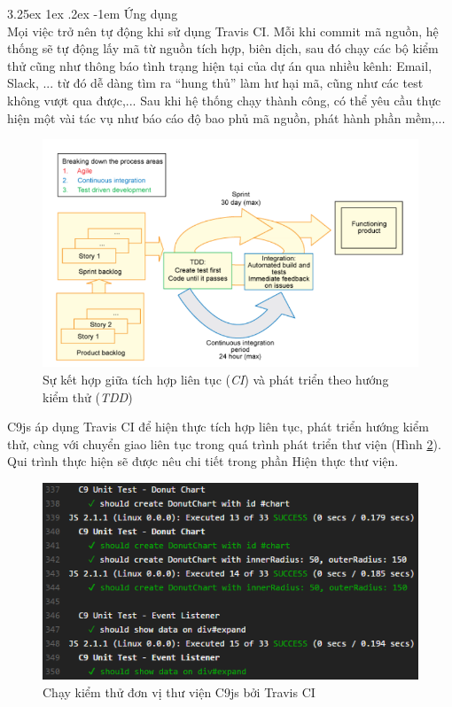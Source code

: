 \documentclass[12pt,a4paper,twoside]{article}
\makeatletter
\newcommand*\NewPage{\newpage\null\thispagestyle{empty}\newpage}
\newcommand{\myparagraph}[1]{\paragraph{#1}\mbox{}\\} %
\renewcommand\paragraph{\@startsection{paragraph}{5}{\z@}%
  {3.25ex \@plus1ex \@minus.2ex}%
  {-1em}%
  {\normalfont\normalsize\bfseries}}
\makeatother
\begin{document}
\myparagraph{Ứng dụng}
Mọi việc trở nên tự động khi sử dụng Travis CI. Mỗi khi commit mã nguồn, hệ thống sẽ tự động lấy mã từ nguồn tích hợp, biên dịch, sau đó chạy các bộ kiểm thử cũng như thông báo tình trạng hiện tại của dự án qua nhiều kênh: Email, Slack, ... từ đó dễ dàng tìm ra “hung thủ” làm hư hại mã, cũng như các test không vượt qua được,... Sau khi hệ thống chạy thành công, có thể yêu cầu thực hiện một vài tác vụ như báo cáo độ bao phủ mã nguồn, phát hành phần mềm,...

\begin{figure}[!h]
	\begin{center}
    \includegraphics[scale=0.9]{image/ci_cd}
    \caption{Sự kết hợp giữa tích hợp liên tục (\textit{CI}) và phát triển theo hướng kiểm thử (\textit{TDD})}
    \label{fig:ci_cd}
	\end{center}
\end{figure}

C9js áp dụng Travis CI để hiện thực tích hợp liên tục, phát triển hướng kiểm thử, cùng với chuyển giao liên tục trong quá trình phát triển thư viện (Hình \ref{fig:ci_c9}). Qui trình thực hiện sẽ được nêu chi tiết trong phần Hiện thực thư viện.

\begin{figure}[!h]
	\begin{center}
    \includegraphics[scale=1]{image/ci_c9}
    \caption{Chạy kiểm thử đơn vị thư viện C9js bởi Travis CI}
    \label{fig:ci_c9}
	\end{center}
\end{figure}
\clearpage
\NewPage
\end{document}
